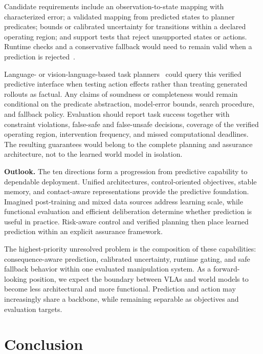 \documentclass{ieeeaccess}
\begin{document}
\textcolor[RGB]{104,48,148}{Candidate requirements include an observation-to-state mapping with characterized error; a validated mapping from predicted states to planner predicates; bounds or calibrated uncertainty for transitions within a declared operating region; and support tests that reject unsupported states or actions. Runtime checks and a conservative fallback would need to remain valid when a prediction is rejected~\cite{cbf,hjreach}.}

Language- or vision-language-based task planners~\cite{ontollmtamp} could query this verified predictive interface when testing action effects rather than treating generated rollouts as factual. Any claims of soundness or completeness would remain conditional on the predicate abstraction, model-error bounds, search procedure, and fallback policy. Evaluation should report task success together with constraint violations, false-safe and false-unsafe decisions, coverage of the verified operating region, intervention frequency, and missed computational deadlines. The resulting guarantees would belong to the complete planning and assurance architecture, not to the learned world model in isolation.

\medskip
\noindent\textbf{Outlook.}
The ten directions form a progression from predictive capability to dependable deployment. Unified architectures, control-oriented objectives, stable memory, and contact-aware representations provide the predictive foundation. Imagined post-training and mixed data sources address learning scale, while functional evaluation and efficient deliberation determine whether prediction is useful in practice. Risk-aware control and verified planning then place learned prediction within an explicit assurance framework.

The highest-priority unresolved problem is the composition of these capabilities: consequence-aware prediction, calibrated uncertainty, runtime gating, and safe fallback behavior within one evaluated manipulation system. As a forward-looking position, we expect the boundary between VLAs and world models to become less architectural and more functional. Prediction and action may increasingly share a backbone, while remaining separable as objectives and evaluation targets.



\section{Conclusion}
\label{sec:conclusion}
\end{document}
